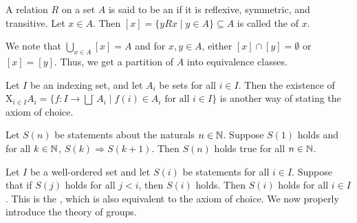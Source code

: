 \begin{definition}
    A relation $R$ on a set $A$ is said to be an  if it is reflexive, symmetric, and transitive. Let $x \in A$. Then $[x] = \{yRx \mid y \in A\} \subseteq A$ is called the  of $x$.
\end{definition}

We note that $\bigcup_{x \in A} [x] = A$ and for $x,y \in A$, either $[x] \cap [y] = \emptyset$ or $[x] = [y]$. Thus, we get a partition of $A$ into equivalence classes.

Let $I$ be an indexing set, and let $A_{i}$ be sets for all $i \in I$. Then the existence of $\text{X}_{i \in I} A_{i} = \{f:I \to \overset{\cdot}{\bigsqcup} A_{i} \mid f(i) \in A_{i} \text{ for all } i \in I\}$ is another way of stating the axiom of choice.

\begin{theorem}
    Let $S(n)$ be statements about the naturals $n \in \mathbb{N}$. Suppose $S(1)$ holds and for all $k \in \mathbb{N}$, $S(k) \Rightarrow S(k+1)$. Then $S(n)$ holds true for all $n \in \mathbb{N}$.
\end{theorem}

Let $I$ be a well-ordered set and let $S(i)$ be statements for all $i \in I$. Suppose that if $S(j)$ holds for all $j < i$, then $S(i)$ holds. Then $S(i)$ holds for all $i \in I$. This is the , which is also equivalent to the axiom of choice. We now properly introduce the theory of groups.

